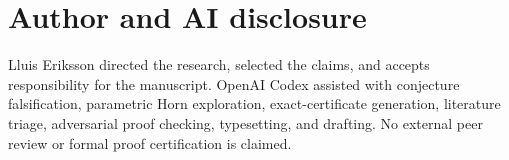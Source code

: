 \documentclass[11pt]{article}
\begin{document}
\section*{Author and AI disclosure}

Lluis Eriksson directed the research, selected the claims, and accepts
responsibility for the manuscript.  OpenAI Codex assisted with conjecture
falsification, parametric Horn exploration, exact-certificate generation,
literature triage, adversarial proof checking, typesetting, and drafting.  No
external peer review or formal proof certification is claimed.



\end{document}
